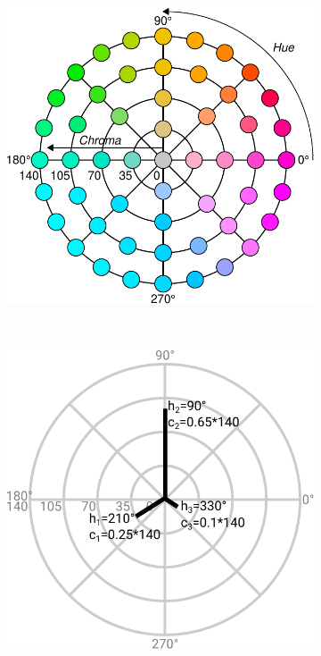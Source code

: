 \documentclass[parskip=half]{scrartcl}
\begin{document}
\begin{appendix}
\begin{figure}[!htb]
\centering
  \begin{subfigure}[t]{0.4\textwidth}
  \centering
  \includegraphics[width = \textwidth]{./fig/cielch.pdf}
  \label{fig:cielch}
  \end{subfigure}%
  ~
  \begin{subfigure}[t]{0.4\textwidth}
  \includegraphics[width = \textwidth]{./fig/polar_vectors.pdf}

\end{subfigure}
\end{figure}
\end{appendix}
\end{document}
